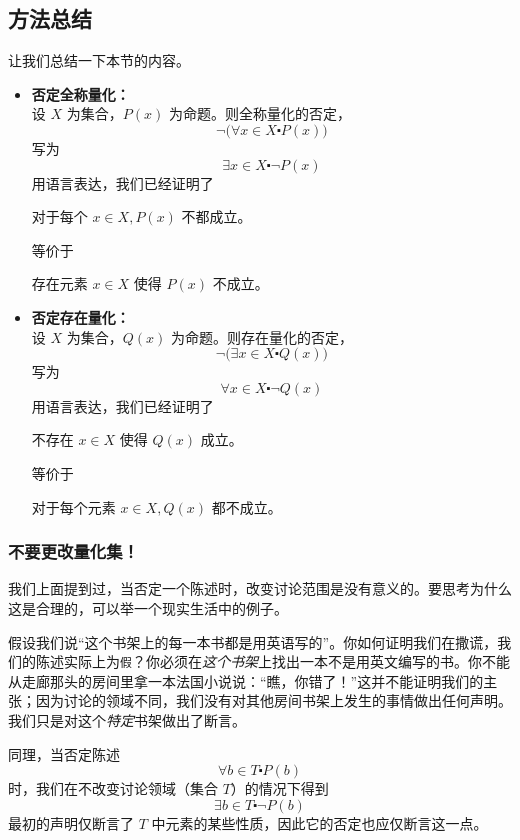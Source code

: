\subsection{方法总结}

让我们总结一下本节的内容。
\begin{itemize}
    \item \textbf{否定全称量化：} \\
        设 $X$ 为集合，$P(x)$ 为命题。则全称量化的否定，
        \[\neg \big(\forall x \in X \centerdot P(x)\big)\]
        写为
        \[\exists x \in X \centerdot \neg P(x)\]
        用语言表达，我们已经证明了
        \begin{center}
            对于每个 $x \in X, P(x)$ 不都成立。
        \end{center}
        等价于
        \begin{center}
            存在元素 $x \in X$ 使得 $P(x)$ 不成立。
        \end{center}
    \item \textbf{否定存在量化：} \\
        设 $X$ 为集合，$Q(x)$ 为命题。则存在量化的否定，
        \[\neg \big(\exists x \in X \centerdot Q(x)\big)\]
        写为
        \[\forall x \in X \centerdot \neg Q(x)\]
        用语言表达，我们已经证明了
        \begin{center}
            不存在 $x \in X$ 使得 $Q(x)$ 成立。
        \end{center}
        等价于
        \begin{center}
            对于每个元素 $x \in X, Q(x)$ 都不成立。
        \end{center}
\end{itemize}

\subsubsection*{不要更改量化集！}

我们上面提到过，当否定一个陈述时，改变讨论范围是没有意义的。要思考为什么这是合理的，可以举一个现实生活中的例子。

假设我们说``这个书架上的每一本书都是用英语写的''。你如何证明我们在撒谎，我们的陈述实际上为\verb|假|？你必须在\emph{这个书架}上找出一本不是用英文编写的书。你不能从走廊那头的房间里拿一本法国小说说：``瞧，你错了！''这并不能证明我们的主张；因为讨论的领域不同，我们没有对其他房间书架上发生的事情做出任何声明。我们只是对这个\emph{特定}书架做出了断言。

同理，当否定陈述
\[\forall b \in T \centerdot P(b)\]
时，我们在不改变讨论领域（集合 $T$）的情况下得到
\[\exists b \in T \centerdot \neg P(b)\]
最初的声明仅断言了 $T$ 中元素的某些性质，因此它的否定也应仅断言这一点。
